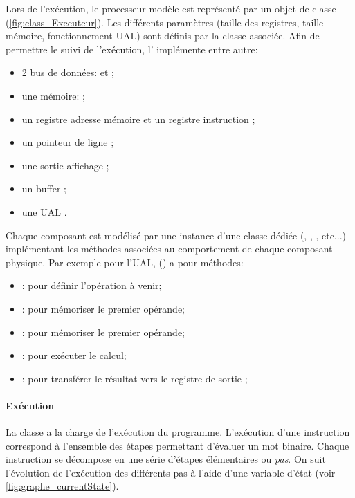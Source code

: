 Lors de l'exécution, le processeur modèle est représenté par un objet de classe  (\cref{fig:class_Executeur}). Les différents paramètres (taille des registres, taille mémoire, fonctionnement UAL) sont définis par la classe  associée. Afin de permettre le suivi de l'exécution, l' implémente entre autre:
\begin{itemize}
	\item 2 bus de données:  et ;
	\item une mémoire: ;
	\item un registre adresse mémoire  et un registre instruction ;
	\item un pointeur de ligne ;
	\item une sortie affichage ;
	\item un buffer ;
	\item une UAL .
\end{itemize}



Chaque composant est modélisé par une instance d'une classe dédiée (, , , etc...) implémentant les méthodes associées au comportement de chaque composant physique. Par exemple pour l'UAL, () a pour méthodes:
\begin{itemize}
	\item  {}: pour définir l'opération à venir;
	\item {}: pour mémoriser le premier opérande;
	\item {}: pour mémoriser le premier opérande;
	\item {}: pour exécuter le calcul;
	\item {}: pour transférer le résultat vers le registre de sortie ;
\end{itemize}



\paragraph{Exécution}
La classe  a la charge de l'exécution du programme. L'exécution d'une instruction correspond à l'ensemble des étapes permettant d'évaluer un mot binaire. Chaque instruction se décompose en une série d'étapes élémentaires ou \textit{pas}. On suit l'évolution de l'exécution des différents pas à l'aide d'une variable d'état  (voir \cref{fig:graphe_currentState}).


